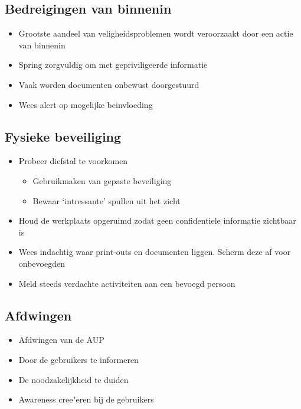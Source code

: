 \documentclass{article}
\begin{document}
\subsection{Bedreigingen van binnenin}

\begin{itemize}
    \item Grootste aandeel van veligheidsproblemen wordt veroorzaakt door een actie van binnenin
    \item Spring zorgvuldig om met gepriviligeerde informatie
    \item Vaak worden documenten onbewust doorgestuurd
    \item Wees alert op mogelijke beinvloeding
\end{itemize}

\subsection{Fysieke beveiliging}

\begin{itemize}
    \item Probeer diefstal te voorkomen
    \begin{itemize}
        \item Gebruikmaken van gepaste beveiliging
        \item Bewaar `intressante' spullen uit het zicht
    \end{itemize}
    \item Houd de werkplaats opgeruimd zodat geen confidentiele informatie zichtbaar is
    \item Wees indachtig waar print-outs en documenten liggen. Scherm deze af voor onbevoegden
    \item Meld steeds verdachte activiteiten aan een bevoegd persoon
\end{itemize}

\subsection{Afdwingen}

\begin{itemize}
    \item Afdwingen van de AUP
    \item Door de gebruikers te informeren
    \item De noodzakelijkheid te duiden
    \item Awareness cree"eren bij de gebruikers
\end{itemize}
\end{document}
